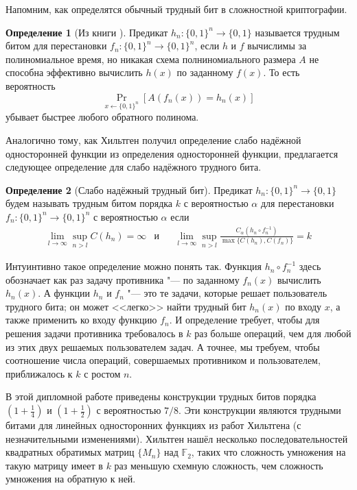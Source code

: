 \documentclass[oneside, a4paper]{article}
\theoremstyle{definition}
\newtheorem{definition}{Определение}
\theoremstyle{remark}
\newcommand\F{\ensuremath{{\mathbb F}_2}}
\begin{document}
Напомним, как определятся обычный трудный бит в сложностной криптографии.

\begin{definition}[Из книги \cite{goldreich}]
Предикат $h_n : \{0, 1\}^n \to \{0, 1\}$ называется трудным битом для
перестановки $f_n : \{0, 1\}^n \to \{0, 1\}^n$, если $h$ и $f$ вычислимы за
полиномиальное время, но никакая схема полниномиального размера $A$ не способна
эффективно вычислить $h(x)$ по заданному $f(x)$. То есть вероятность
\[
\Pr_{x \gets \{0, 1\}^n}[A(f_n(x)) = h_n(x)]
\]
убывает быстрее любого обратного полинома.
\end{definition}

Аналогично тому, как Хильтген получил определение слабо надёжной односторонней
функции из определения односторонней функции, предлагается следующее определение
для слабо надёжного трудного бита.

\begin{definition}[Слабо надёжный трудный бит]
Предикат $h_n : \{0, 1\}^n \to \{0, 1\}$ будем называть трудным битом порядка
$k$ с вероятностью $\alpha$ для перестановки $f_n : \{0, 1\}^n \to \{0, 1\}^n$ с
вероятностью $\alpha$ если
\[
\begin{aligned}
&\lim_{l \to \infty} \sup_{n > l} C(h_n) = \infty
&
\text{и}&
&
\lim_{l \to \infty} \sup_{n > l} \frac {C_\alpha(h_n \circ f_n^{-1})} {\max \{ C(h_n), C(f_n) \}} = k&
\end{aligned}
\]
\end{definition}

Интуинтивно такое определение можно понять так. Функция $h_n \circ f_n^{-1}$
здесь обозначает как раз задачу противника "--- по заданному $f_n(x)$ вычислить
$h_n(x)$. А функции $h_n$ и $f_n$ "--- это те задачи, которые решает
пользователь трудного бита; он может <<легко>> найти трудный бит $h_n(x)$ по
входу $x$, а также применить ко входу функцию $f_n$. И определение требует,
чтобы для решения задачи противника требовалось в $k$ раз больше операций, чем
для любой из этих двух решаемых пользователем задач. А точнее, мы требуем, чтобы
соотношение числа операций, совершаемых противником и пользователем,
приближалось к $k$ с ростом $n$.


В этой дипломной работе приведены конструкции трудных битов порядка $(1
+ \frac 1 4)$ и $(1 + \frac 1 2)$ с вероятностью $7/8$. Эти конструкции
являются трудными битами для линейных односторонних функциях из работ Хильтгена
\cite{hiltgen1993} (с незначительными изменениями). Хильтген нашёл несколько
последовательностей квадратных обратимых матриц $\{M_n\}$ над $\F$, таких что
сложность умножения на такую матрицу имеет в $k$ раз меньшую схемную сложность,
чем сложность умножения на обратную к ней.
\end{document}
